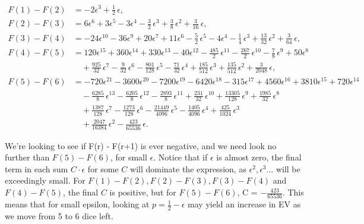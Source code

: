 \documentclass[11pt, oneside]{article} 	%
\begin{document}
\[
\begin{aligned}
F(1) - F(2) &= -2 \epsilon^{3} + \tfrac{1}{2}\,\epsilon, \\[6pt]
F(2) - F(3) &= 6 \epsilon^{6} + 3 \epsilon^{5} - 3 \epsilon^{4} - \tfrac{3}{2}\,\epsilon^{3} + \tfrac{3}{8}\,\epsilon^{2} + \tfrac{3}{16}\,\epsilon, \\[6pt]
F(3) - F(4) &= -24 \epsilon^{10} - 36 \epsilon^{9} + 20 \epsilon^{7} + 11 \epsilon^{6} - \tfrac{5}{2}\,\epsilon^{5} - 4 \epsilon^{4} - \tfrac{1}{4}\,\epsilon^{3} + \tfrac{13}{32}\,\epsilon^{2} + \tfrac{3}{64}\,\epsilon, \\[6pt]
F(4) - F(5) &= 120 \epsilon^{15} + 360 \epsilon^{14} + 330 \epsilon^{13} - 40 \epsilon^{12} - \tfrac{485}{2}\,\epsilon^{11} - \tfrac{267}{2}\,\epsilon^{10} - \tfrac{7}{8}\,\epsilon^{9} + 50 \epsilon^{8} \\
&\quad + \tfrac{925}{32}\,\epsilon^{7} - \tfrac{9}{32}\,\epsilon^{6} - \tfrac{801}{128}\,\epsilon^{5} - \tfrac{71}{32}\,\epsilon^{4} + \tfrac{185}{512}\,\epsilon^{3} + \tfrac{135}{512}\,\epsilon^{2} + \tfrac{3}{2048}\,\epsilon, \\[6pt]
F(5) - F(6) &= -720 \epsilon^{21} - 3600 \epsilon^{20} - 7200 \epsilon^{19} - 6420 \epsilon^{18} - 315 \epsilon^{17} + 4560 \epsilon^{16} + 3810 \epsilon^{15} + 720 \epsilon^{14} \\
&\quad - \tfrac{6285}{8}\,\epsilon^{13} - \tfrac{6205}{8}\,\epsilon^{12} - \tfrac{2893}{8}\,\epsilon^{11} + \tfrac{231}{32}\,\epsilon^{10} + \tfrac{13305}{128}\,\epsilon^{9} + \tfrac{1985}{32}\,\epsilon^{8} \\
&\quad + \tfrac{1387}{128}\,\epsilon^{7} - \tfrac{1273}{128}\,\epsilon^{6} - \tfrac{21449}{4096}\,\epsilon^{5} - \tfrac{1405}{4096}\,\epsilon^{4} + \tfrac{425}{1024}\,\epsilon^{3} \\
&\quad + \tfrac{2047}{16384}\,\epsilon^{2} - \tfrac{423}{65536}\,\epsilon.
\end{aligned}
\]

We're looking to see if F(r) - F(r+1) is ever negative, and we need look no further than $F(5) - F(6)$, for small $\epsilon$.   Notice that if $\epsilon$ is almost zero, the final term in each sum $C\cdot \epsilon$ for some $C$ will dominate the expression, as $\epsilon^2, \epsilon^3...$ will be exceedingly small.  For $F(1) - F(2), F(2) - F(3), F(3) - F(4)$ and $F(4) - F(5)$, the final  $C$ is positive, but for $F(5) - F(6)$, C = $-\frac{423}{65536}$.  This means that for small epsilon, looking at $p = \frac1{2} - \epsilon$ may yield an increase in EV as we move from 5 to 6 dice left.
\end{document}
